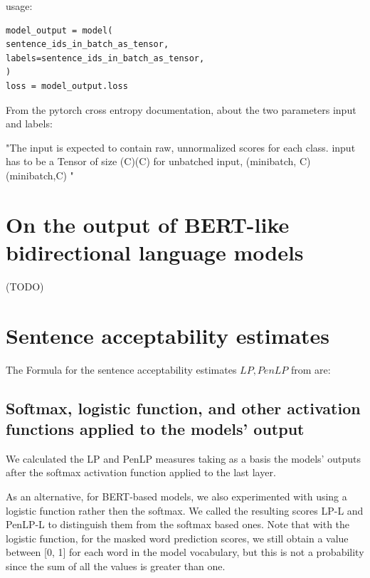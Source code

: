 usage:
\begin{lstlisting}
model_output = model(
sentence_ids_in_batch_as_tensor,
labels=sentence_ids_in_batch_as_tensor,
)
loss = model_output.loss
\end{lstlisting}

From the pytorch cross entropy documentation, about the two parameters input and labels:

"The input is expected to contain raw, unnormalized scores for each class. input has to be a Tensor of size (C)(C) for unbatched input, (minibatch, C)(minibatch,C) "



\pagebreak

\section{On the output of BERT-like bidirectional language models}
(TODO)

\pagebreak

\section{Sentence acceptability estimates}

The Formula for the sentence acceptability estimates \( LP, PenLP \) from \citet{lau2020furiously} are:

\subsection{Softmax, logistic function, and other activation functions applied to the models' output}
\label{sec:softmax}
We calculated the LP and PenLP measures taking as a basis the models' outputs after the softmax activation function applied to the last layer. 

As an alternative, for BERT-based models, we also experimented with using a logistic function rather then the softmax. We called the resulting scores LP-L and PenLP-L to distinguish them from the softmax based ones. Note that with the logistic function, for the masked word prediction scores, we still obtain a value between [0, 1] for each word in the model vocabulary, but this is not a probability since the sum of all the values is greater than one.

